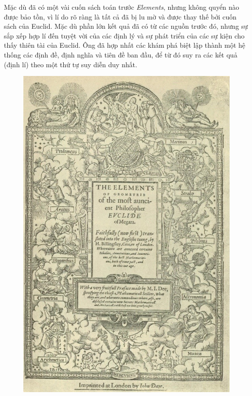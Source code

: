 \begin{multicols}{2}
	\vskip 0.1cm
	Mặc dù đã có một vài cuốn sách toán trước \textit{Elements}, nhưng không quyển nào được bảo  tồn, vì lí do rõ ràng là tất cả đã bị lu mờ và được thay thế bởi cuốn sách của Euclid.
	\vskip 0.1cm
	Mặc dù phần lớn kết quả đã có từ các nguồn trước đó, nhưng sự sắp xếp hợp lí đến tuyệt vời của các định lý và sự phát triển của các sự kiện cho thấy thiên tài của Euclid. Ông đã hợp nhất các khám phá biệt lập thành một hệ thống các định đề, định nghĩa và tiên đề ban đầu, để từ đó suy ra các kết quả (định lí) theo một thứ tự suy diễn duy nhất.
	\begin{figure}[H]
		\vspace*{-5pt}
		\centering
		\captionsetup{labelformat= empty, justification=centering}
		\includegraphics[width= 1\linewidth]{3}

\end{figure}
\end{multicols}
